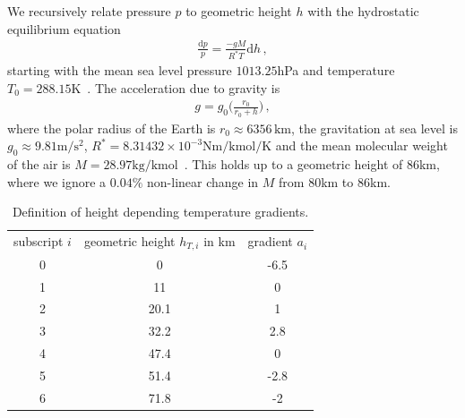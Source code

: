 We recursively relate pressure $p$ to geometric height $h$ with the hydrostatic equilibrium equation
\begin{align}
	\frac{\text{d}p}{p} = \frac{- g M}{R^* T} \text{d} h \, ,\label{eq:hydr}
\end{align}
starting with the mean sea level pressure $1013.25$hPa and temperature $T_0 = 288.15$K~\cite{atmosphere1976us}.
The acceleration due to gravity is
\begin{align}
	g = g_0 \Bigg( \frac{r_0}{r_0 + h} \Bigg) \, ,
\end{align}
where the polar radius of the Earth is $r_0 \approx 6356 \, \text{km}$, the gravitation at sea level is $g_0 \approx 9.81 \text{m}/\text{s}^2$, $R^* = 8.31432 \times 10^{-3} \text{Nm} / \text{kmol} / \text{K}$ and the mean molecular weight of the air is $M = 28.97 \text{kg/kmol}$~\cite{atmosphere1976us}.
This holds up to a geometric height of $86$km, where we ignore a $0.04\%$ non-linear change in $M$ from $80$km to $86$km.
\begin{table}
	\centering
	\begin{tabular}{ |c||c|c|  }
		\hline
		subscript $i$ & geometric height $h_{T,i}$ in km&gradient $a_i$\\
		\hhline{|=||=|=|}
		0& 0 & -6.5\\
		1& 11 & 0\\
		2& 20.1& 1\\
		3& 32.2& 2.8\\
		4& 47.4& 0\\
		5& 51.4& -2.8\\
		6& 71.8& -2\\
		\hline
	\end{tabular}
	\caption[Height depending temperature gradients]{Definition of height depending temperature gradients.}
	\label{tab:tempGrad}
\end{table}

